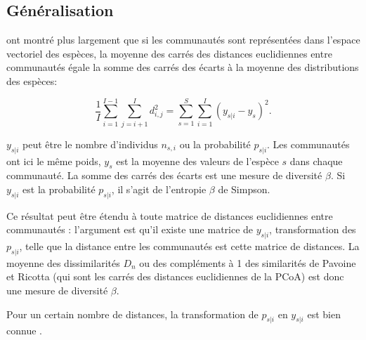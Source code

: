 \documentclass[
  11pt,
  french,
  a4paper,
  extrafontsizes,onecolumn,openright
  ]{memoir}
\begin{document}
\normalsize

\subsection{Généralisation}\label{guxe9nuxe9ralisation}

\textcite{Legendre1999} ont montré plus largement que si les communautés sont représentées dans l'espace vectoriel des espèces, la moyenne des carrés des distances euclidiennes entre communautés égale la somme des carrés des écarts à la moyenne des distributions des espèces:

\begin{equation}
  \label{eq:Legendre1999}
  \frac{1}{I} \sum_{i=1}^{I-1}{\sum_{j=i+1}^{I}{d_{i,j}^2}}
  = \sum_{s=1}^{S}{\sum_{i=1}^{I}{\left(y_{s|i}-y_s \right)^2}}.
\end{equation}

\(y_{s|i}\) peut être le nombre d'individus \(n_{s,i}\) ou la probabilité \(p_{s|i}\).
Les communautés ont ici le même poids, \(y_s\) est la moyenne des valeurs de l'espèce \(s\) dans chaque communauté.
La somme des carrés des écarts est une mesure de diversité \(\beta\).
Si \(y_{s|i}\) est la probabilité \(p_{s|i}\), il s'agit de l'entropie \(\beta\) de Simpson.

Ce résultat peut être étendu à toute matrice de distances euclidiennes entre communautés \autocite{Legendre2005} : l'argument est qu'il existe une matrice de \(y_{s|i}\), transformation des \(p_{s|i}\), telle que la distance entre les communautés est cette matrice de distances.
La moyenne des dissimilarités \(D_n\) ou des compléments à 1 des similarités de Pavoine et Ricotta (qui sont les carrés des distances euclidiennes de la PCoA) est donc une mesure de diversité \(\beta\).

Pour un certain nombre de distances, la transformation de \(p_{s|i}\) en \(y_{s|i}\) est bien connue \autocite{Legendre2001}.



\scriptsize
\end{document}
